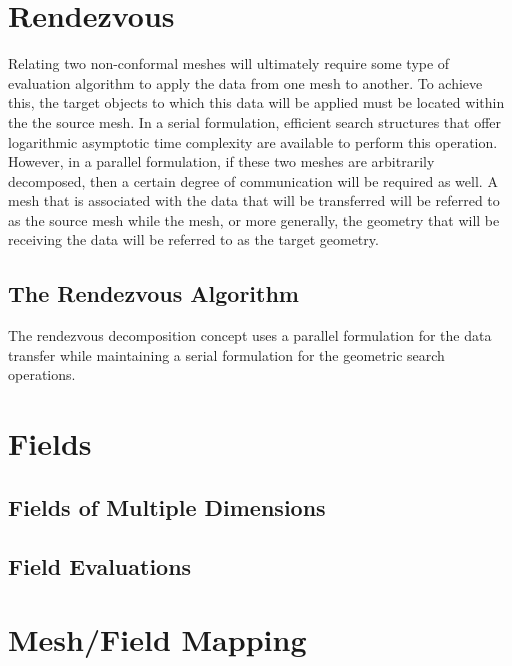 \documentclass[letterpaper,12pt]{article}
\begin{document}
\section{Rendezvous}\label{sec:rendezvous}
Relating two non-conformal meshes will ultimately require some type of
evaluation algorithm to apply the data from one mesh to another. To
achieve this, the target objects to which this data will be applied
must be located within the the source mesh. In a serial formulation,
efficient search structures that offer logarithmic asymptotic time
complexity are available to perform this operation. However, in a
parallel formulation, if these two meshes are arbitrarily decomposed,
then a certain degree of communication will be required as well. A
mesh that is associated with the data that will be transferred will be
referred to as the source mesh while the mesh, or more generally, the
geometry that will be receiving the data will be referred to as the
target geometry.

\subsection{The Rendezvous Algorithm}\label{subsec:rendezvous_alg}
The rendezvous decomposition concept uses a parallel formulation for
the data transfer while maintaining a serial formulation for the
geometric search operations.

\clearpage

\section{Fields}\label{sec:field}

\subsection{Fields of Multiple Dimensions}\label{subsec:field_dim}

\subsection{Field Evaluations}\label{subsec:eval}

\clearpage

\section{Mesh/Field Mapping}\label{sec:map}
\end{document}
